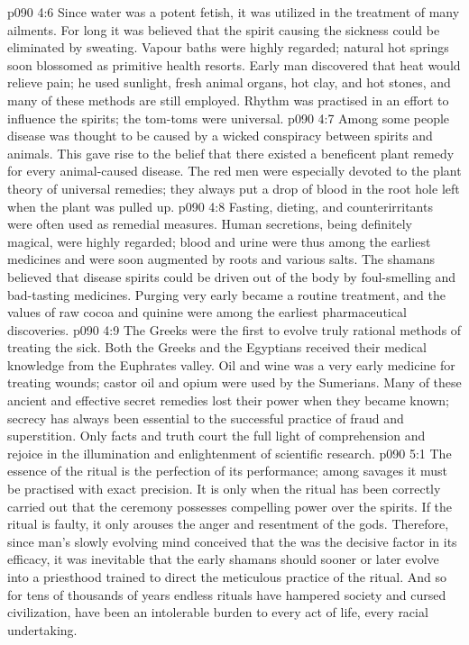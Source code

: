\vs p090 4:6 Since water was a potent fetish, it was utilized in the treatment of many ailments. For long it was believed that the spirit causing the sickness could be eliminated by sweating. Vapour baths were highly regarded; natural hot springs soon blossomed as primitive health resorts. Early man discovered that heat would relieve pain; he used sunlight, fresh animal organs, hot clay, and hot stones, and many of these methods are still employed. Rhythm was practised in an effort to influence the spirits; the tom\hyp{}toms were universal.
\vs p090 4:7 Among some people disease was thought to be caused by a wicked conspiracy between spirits and animals. This gave rise to the belief that there existed a beneficent plant remedy for every animal\hyp{}caused disease. The red men were especially devoted to the plant theory of universal remedies; they always put a drop of blood in the root hole left when the plant was pulled up.
\vs p090 4:8 Fasting, dieting, and counterirritants were often used as remedial measures. Human secretions, being definitely magical, were highly regarded; blood and urine were thus among the earliest medicines and were soon augmented by roots and various salts. The shamans believed that disease spirits could be driven out of the body by foul\hyp{}smelling and bad\hyp{}tasting medicines. Purging very early became a routine treatment, and the values of raw cocoa and quinine were among the earliest pharmaceutical discoveries.
\vs p090 4:9 The Greeks were the first to evolve truly rational methods of treating the sick. Both the Greeks and the Egyptians received their medical knowledge from the Euphrates valley. Oil and wine was a very early medicine for treating wounds; castor oil and opium were used by the Sumerians. Many of these ancient and effective secret remedies lost their power when they became known; secrecy has always been essential to the successful practice of fraud and superstition. Only facts and truth court the full light of comprehension and rejoice in the illumination and enlightenment of scientific research.
\vs p090 5:1 The essence of the ritual is the perfection of its performance; among savages it must be practised with exact precision. It is only when the ritual has been correctly carried out that the ceremony possesses compelling power over the spirits. If the ritual is faulty, it only arouses the anger and resentment of the gods. Therefore, since man’s slowly evolving mind conceived that the  was the decisive factor in its efficacy, it was inevitable that the early shamans should sooner or later evolve into a priesthood trained to direct the meticulous practice of the ritual. And so for tens of thousands of years endless rituals have hampered society and cursed civilization, have been an intolerable burden to every act of life, every racial undertaking.
